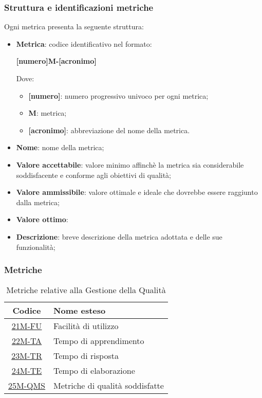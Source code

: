 \subsubsection{Struttura e identificazioni metriche}
Ogni metrica presenta la seguente struttura:
\begin{itemize}
	\item \textbf{Metrica}:
	      codice identificativo nel formato:
	      \begin{center}
		      \textbf{[numero]M-[acronimo]}
	      \end{center}
	      Dove:
	      \begin{itemize}
		      \item \textbf{[numero]}: numero progressivo univoco per ogni metrica;
		      \item \textbf{M}: metrica;
		      \item \textbf{[acronimo]}: abbreviazione del nome della metrica.
	      \end{itemize}
	\item \textbf{Nome}: nome della metrica;
	\item \textbf{Valore accettabile}: valore minimo affinchè la metrica sia considerabile soddisfacente e conforme agli obiettivi di qualità;
	\item \textbf{Valore ammissibile}: valore ottimale e ideale che dovrebbe essere raggiunto dalla metrica;
	\item \textbf{Valore ottimo}:
	\item \textbf{Descrizione}: breve descrizione della metrica adottata e delle sue funzionalità;
\end{itemize}

\subsubsection{Metriche}
\begin{table}[!h]
	\centering
	\begin{tabular}{ | c | l | }
		\hline
		\textbf{Codice}                      & \textbf{Nome esteso}            \\
		\hline
		\underline{\hyperlink{21M}{21M-FU}}  & Facilità di utilizzo            \\
        \underline{\hyperlink{22M}{22M-TA}}  & Tempo di apprendimento          \\
        \underline{\hyperlink{23M}{23M-TR}}  & Tempo di risposta               \\
        \underline{\hyperlink{24M}{24M-TE}}  & Tempo di elaborazione           \\
        \underline{\hyperlink{25M}{25M-QMS}} & Metriche di qualità soddisfatte \\
		\hline
	\end{tabular}
	\caption{Metriche relative alla Gestione della Qualità}
\end{table}

